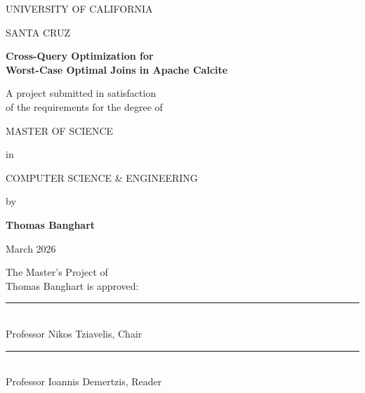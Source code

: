 \documentclass[11pt]{article}
\begin{document}
\begin{titlepage}
\centering

\vspace*{1.5cm}

UNIVERSITY OF CALIFORNIA

\vspace{0.4cm}

SANTA CRUZ

\vspace{1.2cm}

{\large\bfseries Cross-Query Optimization for\\[0.3em] Worst-Case Optimal Joins in Apache Calcite}

\vspace{0.8cm}

A project submitted in satisfaction\\
of the requirements for the degree of

\vspace{0.8cm}

MASTER OF SCIENCE

\vspace{0.4cm}

in

\vspace{0.4cm}

COMPUTER SCIENCE \& ENGINEERING

\vspace{0.2cm}

by

\vspace{0.2cm}

{\large\bfseries Thomas Banghart}

\vspace{0.2cm}

March 2026

\vfill

\begin{flushright}
\begin{minipage}{0.55\textwidth}
The Master's Project of\\
Thomas Banghart is approved:

\vspace{1cm}

\rule{\textwidth}{0.4pt}\\
Professor Nikos Tziavelis, Chair

\vspace{1cm}

\rule{\textwidth}{0.4pt}\\
Professor Ioannis Demertzis, Reader
\end{minipage}
\end{flushright}

\end{titlepage}
\end{document}
